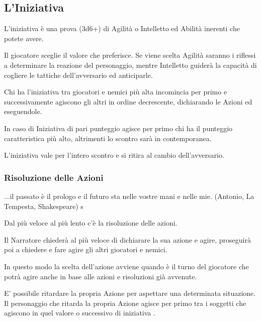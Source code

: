 \documentclass[a4paper,11pt,twoside,openany]{book}
\begin{document}
\subsection{L'Iniziativa}

\label{liniziativa}

L'iniziativa è una prova (3d6+) di Agilità o Intelletto ed Abilità inerenti che potete avere.

Il giocatore sceglie il valore che preferisce. Se viene scelta Agilità saranno i riflessi a determinare la reazione del personaggio, mentre Intelletto guiderà la capacità di cogliere le tattiche dell'avversario ed anticiparle.

Chi ha l'iniziativa tra giocatori e nemici più alta incomincia per primo e successivamente agiscono gli altri in ordine decrescente, dichiarando le Azioni ed eseguendole.

In caso di Iniziativa di pari punteggio agisce per primo chi ha il punteggio caratteristica più alto, altrimenti lo scontro sarà in contemporanea.

L'iniziativa vale per l'intero scontro e si ritira al cambio dell'avversario.

\subsubsection{Risoluzione delle Azioni}

\begin{tcolorbox}[enhanced,arc=5pt,boxrule=0.3pt]{
...il passato è il prologo e il futuro sta nelle vostre mani e nelle mie. (Antonio, La Tempesta, Shakespeare)}
s\end{tcolorbox}\medskip


\label{risoluzione-delle-azioni}

Dal più veloce al più lento c'è la risoluzione delle azioni.

Il Narratore chiederà al più veloce di dichiarare la sua azione e agire, proseguirà poi a chiedere e fare agire gli altri giocatori e nemici.

In questo modo la scelta dell'azione avviene quando è il turno del giocatore che potrà agire anche in base alle azioni e risoluzioni già avvenute.

E' possibile ritardare la propria Azione per aspettare una determinata situazione. Il personaggio che ritarda la propria Azione agisce per primo tra i soggetti che agiscono in quel valore o successivo di iniziativa .
\end{document}
